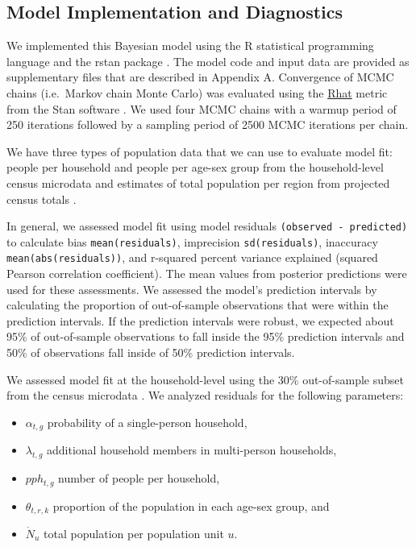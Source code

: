 \documentclass[]{book}
\providecommand{\tightlist}{%
  \setlength{\itemsep}{0pt}\setlength{\parskip}{0pt}}
\begin{document}
\subsection{Model Implementation and
Diagnostics}\label{model-implementation-and-diagnostics}

We implemented this Bayesian model using the R statistical programming
language \citep{r2020r} and the rstan package \citep{stan2020rstan}. The
model code and input data are provided as supplementary files that are
described in Appendix A. Convergence of MCMC chains (i.e.~Markov chain
Monte Carlo) was evaluated using the
\href{https://mc-stan.org/rstan/reference/Rhat.html}{Rhat} metric from
the Stan software \citep[\citet{stan2020rstan}]{stan2019stan}. We used
four MCMC chains with a warmup period of 250 iterations followed by a
sampling period of 2500 MCMC iterations per chain.

We have three types of population data that we can use to evaluate model
fit: people per household and people per age-sex group from the
household-level census microdata \citep{mpc2019integrated} and estimates
of total population per region from projected census totals
\citep{worldpop2018globalb}.

In general, we assessed model fit using model residuals
\texttt{(observed\ -\ predicted)} to calculate bias
\texttt{mean(residuals)}, imprecision \texttt{sd(residuals)}, inaccuracy
\texttt{mean(abs(residuals))}, and r-squared percent variance explained
(squared Pearson correlation coefficient). The mean values from
posterior predictions were used for these assessments. We assessed the
model's prediction intervals by calculating the proportion of
out-of-sample observations that were within the prediction intervals. If
the prediction intervals were robust, we expected about 95\% of
out-of-sample observations to fall inside the 95\% prediction intervals
and 50\% of observations fall inside of 50\% prediction intervals.

We assessed model fit at the household-level using the 30\%
out-of-sample subset from the census microdata
\citep{mpc2019integrated}. We analyzed residuals for the following
parameters:

\begin{itemize}
\tightlist
\item
  \(\alpha_{t,g}\) probability of a single-person household,
\item
  \(\lambda_{t,g}\) additional household members in multi-person
  households,
\item
  \(pph_{t,g}\) number of people per household,
\item
  \(\theta_{t,r,k}\) proportion of the population in each age-sex group,
  and
\item
  \(\dot{N}_u\) total population per population unit \(u\).
\end{itemize}
\end{document}
